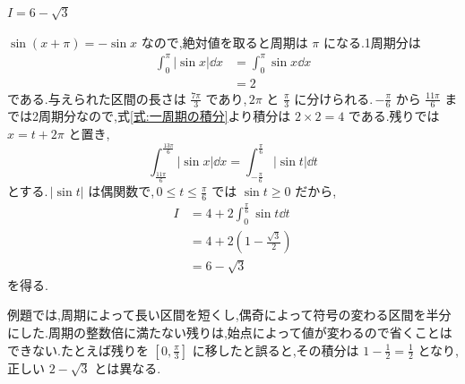 $I=6-\sqrt3$

$\sin(x+\pi)=-\sin x$ なので,絶対値を取ると周期は $\pi$ になる.1周期分は
\[
\begin{aligned}
\int_0^\pi|\sin x|\dd x
 &=\int_0^\pi\sin x\dd x\\
 &=2
\end{aligned}
\]
である.与えられた区間の長さは $\frac{7\pi}{3}$ であり,\,$2\pi$ と $\frac{\pi}{3}$ に分けられる.\,$-\frac{\pi}{6}$ から $\frac{11\pi}{6}$ までは2周期分なので,式\eqref{式:一周期の積分}より積分は $2\times2=4$ である.残りでは $x=t+2\pi$ と置き,
\[
\int_{\frac{11\pi}{6}}^{\frac{13\pi}{6}}|\sin x|\dd x
 =\int_{-\frac{\pi}{6}}^{\frac{\pi}{6}}|\sin t|\dd t
\]
とする.\,$|\sin t|$ は偶関数で,\,$0\le t\le\frac{\pi}{6}$ では $\sin t\ge0$ だから,
\[
\begin{aligned}
I&=4+2\int_0^{\frac{\pi}{6}}\sin t\dd t\\
 &=4+2\left(1-\frac{\sqrt3}{2}\right)\\
 &=6-\sqrt3
\end{aligned}
\]
を得る.

例題では,周期によって長い区間を短くし,偶奇によって符号の変わる区間を半分にした.周期の整数倍に満たない残りは,始点によって値が変わるので省くことはできない.たとえば残りを $\left[0,\frac{\pi}{3}\right]$ に移したと誤ると,その積分は $1-\frac12=\frac12$ となり,正しい $2-\sqrt3$ とは異なる.
